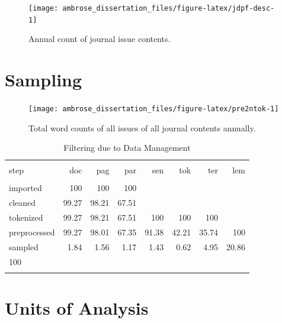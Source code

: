 \documentclass[]{book}
\theoremstyle{definition}
\theoremstyle{definition}
\theoremstyle{definition}
\theoremstyle{remark}
\begin{document}
\begin{figure}

{\centering \texttt{[image: ambrose\_dissertation\_files/figure-latex/jdpf-desc-1]} 

}

\caption{Annual count of journal issue contents.}\label{fig:jdpf-desc}
\end{figure}

\hypertarget{kd-dp1}{%
\section{Sampling}\label{kd-dp1}}

\begin{figure}

{\centering \texttt{[image: ambrose\_dissertation\_files/figure-latex/pre2ntok-1]} 

}

\caption{Total word counts of all issues of all journal contents annually.}\label{fig:pre2ntok}
\end{figure}

\begin{table}[!htbp] \centering 
  \caption{Filtering due to Data Management} 
  \label{tab:filt} 
\begin{tabular}{@{\extracolsep{5pt}} lrrrrrrr} 
\\[-1.8ex]\hline 
\hline \\[-1.8ex] 
step & doc & pag & par & sen & tok & ter & lem \\ 
\hline \\[-1.8ex] 
imported & 100 & 100 & 100 &  &  &  &  \\ 
cleaned & 99.27 & 98.21 & 67.51 &  &  &  &  \\ 
tokenized & 99.27 & 98.21 & 67.51 & 100 & 100 & 100 &  \\ 
preprocessed & 99.27 & 98.01 & 67.35 & 91.38 & 42.21 & 35.74 & 100 \\ 
sampled & 1.84 & 1.56 & 1.17 & 1.43 & 0.62 & 4.95 & 20.86 \\ 
100\\%
\hline \\[-1.8ex] 
\end{tabular} 
\end{table}

\hypertarget{units-of-analysis}{%
\section{Units of Analysis}\label{units-of-analysis}}
\end{document}
